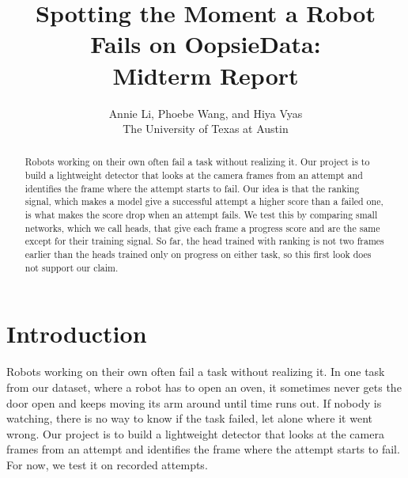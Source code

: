 \documentclass{article}
\title{Spotting the Moment a Robot Fails on OopsieData:\\ Midterm Report}
\author{%
  Annie Li, Phoebe Wang, and Hiya Vyas\\
  The University of Texas at Austin
}
\begin{document}
\maketitle


\begin{abstract}
Robots working on their own often fail a task without realizing it. Our project is to build a lightweight detector that looks at the camera frames from an attempt and identifies the frame where the attempt starts to fail. Our idea is that the ranking signal, which makes a model give a successful attempt a higher score than a failed one, is what makes the score drop when an attempt fails. We test this by comparing small networks, which we call heads, that give each frame a progress score and are the same except for their training signal. So far, the head trained with ranking is not two frames earlier than the heads trained only on progress on either task, so this first look does not support our claim.
\end{abstract}


\section{Introduction}

Robots working on their own often fail a task without realizing it. In one task from our dataset, where a robot has to open an oven, it sometimes never gets the door open and keeps moving its arm around until time runs out. If nobody is watching, there is no way to know if the task failed, let alone where it went wrong. Our project is to build a lightweight detector that looks at the camera frames from an attempt and identifies the frame where the attempt starts to fail. For now, we test it on recorded attempts.
\end{document}
